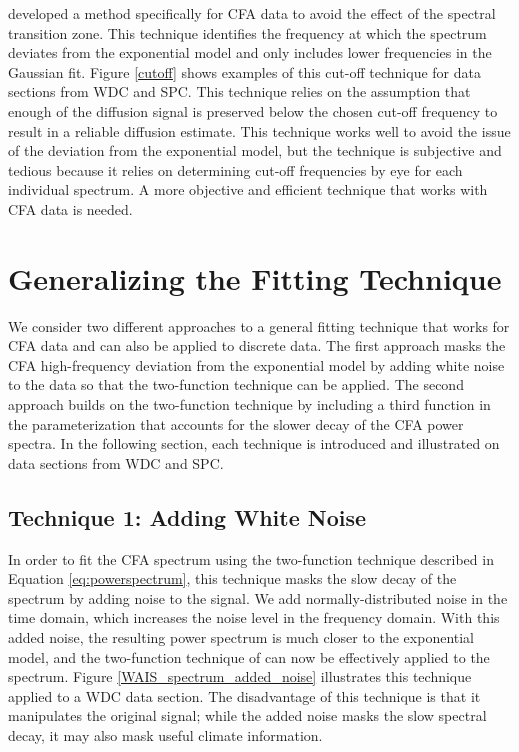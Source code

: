 \documentclass[draft, jgrga]{AGUTeX}
\begin{document}
\begin{article}
\citet{Jones2017a} developed a method specifically for CFA data to avoid the effect of the spectral transition zone. This technique identifies the frequency at which the spectrum deviates from the exponential model and only includes lower frequencies in the Gaussian fit. Figure \ref{cutoff} shows examples of this cut-off technique for data sections from WDC and SPC. This technique relies on the assumption that enough of the diffusion signal is preserved below the chosen cut-off frequency to result in a reliable diffusion estimate. This technique works well to avoid the issue of the deviation from the exponential model, but the technique is subjective and tedious because it relies on determining cut-off frequencies by eye for each individual spectrum. A more objective and efficient technique that works with CFA data is needed.

\section{Generalizing the Fitting Technique}
We consider two different approaches to a general fitting technique that works for CFA data and can also be applied to discrete data. The first approach masks the CFA high-frequency deviation from the exponential model by adding white noise to the data so that the two-function technique can be applied. The second approach builds on the two-function technique by including a third function in the parameterization that accounts for the slower decay of the CFA power spectra. In the following section, each technique is introduced and illustrated on data sections from WDC and SPC.

\subsection{Technique 1: Adding White Noise}
In order to fit the CFA spectrum using the two-function technique described in Equation \ref{eq:powerspectrum}, this technique masks the slow decay of the spectrum by adding noise to the signal. We add normally-distributed noise in the time domain, which increases the noise level in the frequency domain. With this added noise, the resulting power spectrum is much closer to the exponential model, and the two-function technique of \citet{Gkinis2014} can now be effectively applied to the spectrum. Figure \ref{WAIS_spectrum_added_noise} illustrates this technique applied to a WDC data section. The disadvantage of this technique is that it manipulates the original signal; while the added noise masks the slow spectral decay, it may also mask useful climate information.


\end{article}
\end{document}
